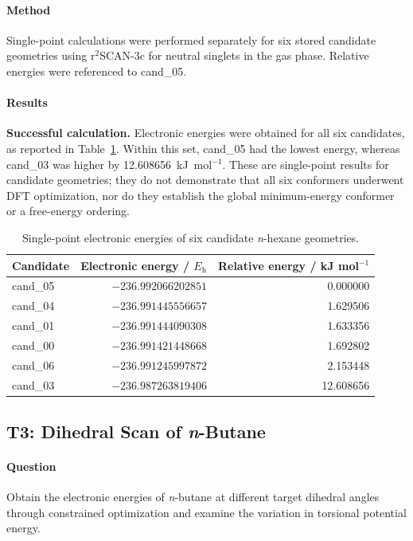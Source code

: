 \documentclass[a4paper,11pt]{article}
\newcommand{\Eh}{E_{\mathrm h}}
\begin{document}
\paragraph{Method}
Single-point calculations were performed separately for six stored candidate geometries using r$^{2}$SCAN-3c for neutral singlets in the gas phase.
Relative energies were referenced to cand\_05.

\paragraph{Results}
\textbf{Successful calculation.} Electronic energies were obtained for all six candidates, as reported in Table~\ref{tab:t2-energies}.
Within this set, cand\_05 had the lowest energy, whereas cand\_03 was higher by 12.608656~kJ~mol$^{-1}$.
These are single-point results for candidate geometries; they do not demonstrate that all six conformers underwent DFT optimization,
nor do they establish the global minimum-energy conformer or a free-energy ordering.

\begin{table}[H]
  \centering\small
  \caption{Single-point electronic energies of six candidate \textit{n}-hexane geometries.}
  \label{tab:t2-energies}
  \begin{tabular}{lrr}
    \toprule
    Candidate & Electronic energy / $\Eh$ & Relative energy / kJ mol$^{-1}$\\
    \midrule
    cand\_05 & $-236.992066202851$ & 0.000000\\
    cand\_04 & $-236.991445556657$ & 1.629506\\
    cand\_01 & $-236.991444090308$ & 1.633356\\
    cand\_00 & $-236.991421448668$ & 1.692802\\
    cand\_06 & $-236.991245997872$ & 2.153448\\
    cand\_03 & $-236.987263819406$ & 12.608656\\
    \bottomrule
  \end{tabular}
\end{table}

\subsection{T3: Dihedral Scan of \textit{n}-Butane}
\paragraph{Question}
Obtain the electronic energies of \textit{n}-butane at different target dihedral angles through constrained optimization and examine the variation in torsional potential energy.
\end{document}

